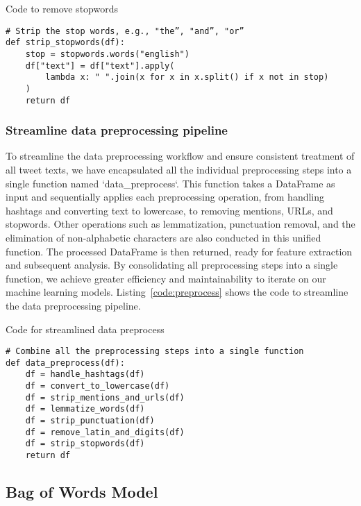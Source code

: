 \documentclass{article}
\begin{document}
\begin{listing}[H]
\caption{Code to remove stopwords}
\label{code:stopwords}
\begin{verbatim}
# Strip the stop words, e.g., "the”, "and”, "or”
def strip_stopwords(df):
    stop = stopwords.words("english")
    df["text"] = df["text"].apply(
        lambda x: " ".join(x for x in x.split() if x not in stop)
    )
    return df
\end{verbatim}
\end{listing}

\subsubsection{Streamline data preprocessing pipeline}

To streamline the data preprocessing workflow and ensure consistent treatment of all tweet texts, we have encapsulated all the individual preprocessing steps into a single function named `data\_preprocess`. This function takes a DataFrame as input and sequentially applies each preprocessing operation, from handling hashtags and converting text to lowercase, to removing mentions, URLs, and stopwords. Other operations such as lemmatization, punctuation removal, and the elimination of non-alphabetic characters are also conducted in this unified function. The processed DataFrame is then returned, ready for feature extraction and subsequent analysis. By consolidating all preprocessing steps into a single function, we achieve greater efficiency and maintainability to iterate on our machine learning models. Listing~\ref{code:preprocess} shows the code to streamline the data preprocessing pipeline.

\begin{listing}[H]
\caption{Code for streamlined data preprocess}
\label{code:preprocess}
\begin{verbatim}
# Combine all the preprocessing steps into a single function
def data_preprocess(df):
    df = handle_hashtags(df)
    df = convert_to_lowercase(df)
    df = strip_mentions_and_urls(df)
    df = lemmatize_words(df)
    df = strip_punctuation(df)
    df = remove_latin_and_digits(df)
    df = strip_stopwords(df)
    return df
\end{verbatim}
\end{listing}


\subsection{Bag of Words Model}
\end{document}
